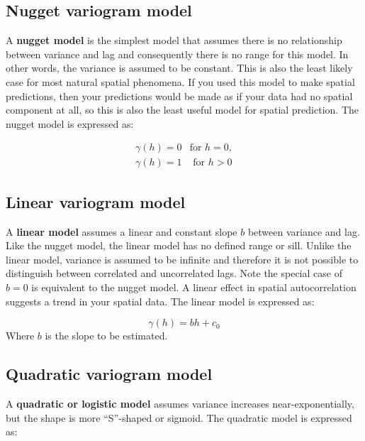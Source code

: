 \documentclass[
]{book}
\begin{document}
\hypertarget{nugget-variogram-model}{%
\subsection{Nugget variogram model}\label{nugget-variogram-model}}

A \textbf{nugget model} is the simplest model that assumes there is no relationship between variance and lag and consequently there is no range for this model. In other words, the variance is assumed to be constant. This is also the least likely case for most natural spatial phenomena. If you used this model to make spatial predictions, then your predictions would be made as if your data had no spatial component at all, so this is also the least useful model for spatial prediction. The nugget model is expressed as:

\[
\begin{array}{ccc}
\gamma{(h)} = 0 & \text{for }h=0, \\
\gamma{(h)} = 1 & \text{ for }h>0
\end{array}
\]

\hypertarget{linear-variogram-model}{%
\subsection{Linear variogram model}\label{linear-variogram-model}}

A \textbf{linear model} assumes a linear and constant slope \(b\) between variance and lag. Like the nugget model, the linear model has no defined range or sill. Unlike the linear model, variance is assumed to be infinite and therefore it is not possible to distinguish between correlated and uncorrelated lags. Note the special case of \(b=0\) is equivalent to the nugget model. A linear effect in spatial autocorrelation suggests a trend in your spatial data. The linear model is expressed as:

\[
\gamma{(h)} = bh+c_0
\]
Where \(b\) is the slope to be estimated.

\hypertarget{quadratic-variogram-model}{%
\subsection{Quadratic variogram model}\label{quadratic-variogram-model}}

A \textbf{quadratic or logistic model} assumes variance increases near-exponentially, but the shape is more ``S''-shaped or sigmoid. The quadratic model is expressed as:
\end{document}
